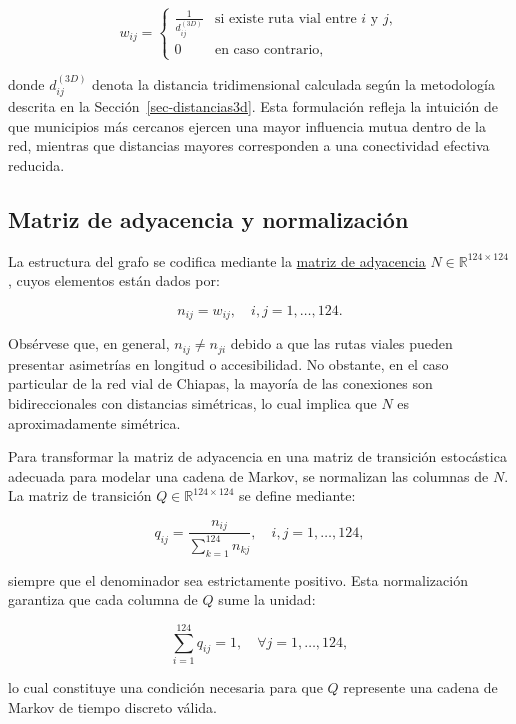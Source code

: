 \documentclass[
  spanish,
  us-letterpaper,
]{scrreprt}
\numberwithin{equation}{section}
\begin{document}
\[
w_{ij} = \begin{cases}
\displaystyle \frac{1}{d_{ij}^{(3D)}} & \text{si existe ruta vial entre } i \text{ y } j, \\
0 & \text{en caso contrario},
\end{cases}
\]

donde \(d_{ij}^{(3D)}\) denota la distancia tridimensional calculada
según la metodología descrita en la Sección~\ref{sec-distancias3d}. Esta
formulación refleja la intuición de que municipios más cercanos ejercen
una mayor influencia mutua dentro de la red, mientras que distancias
mayores corresponden a una conectividad efectiva reducida.

\subsection{Matriz de adyacencia y
normalización}\label{matriz-de-adyacencia-y-normalizaciuxf3n}

La estructura del grafo se codifica mediante la
\href{https://github.com/AngelaOrtiz25/tesis_angela/blob/gh-pages/datos\%20y\%20codigos/matriz_transicion_3d\%20(2).csv}{matriz
de adyacencia} \(N \in \mathbb{R}^{124 \times 124}\), cuyos elementos
están dados por:

\[
n_{ij} = w_{ij}, \quad i,j = 1,\dots,124.
\]

Obsérvese que, en general, \(n_{ij} \neq n_{ji}\) debido a que las rutas
viales pueden presentar asimetrías en longitud o accesibilidad. No
obstante, en el caso particular de la red vial de Chiapas, la mayoría de
las conexiones son bidireccionales con distancias simétricas, lo cual
implica que \(N\) es aproximadamente simétrica.

Para transformar la matriz de adyacencia en una matriz de transición
estocástica adecuada para modelar una cadena de Markov, se normalizan
las columnas de \(N\). La matriz de transición
\(Q \in \mathbb{R}^{124 \times 124}\) se define mediante:

\[
q_{ij} = \frac{n_{ij}}{\sum_{k=1}^{124} n_{kj}}, \quad i,j = 1,\dots,124,
\]

siempre que el denominador sea estrictamente positivo. Esta
normalización garantiza que cada columna de \(Q\) sume la unidad:

\[
\sum_{i=1}^{124} q_{ij} = 1, \quad \forall j = 1,\dots,124,
\]

lo cual constituye una condición necesaria para que \(Q\) represente una
cadena de Markov de tiempo discreto válida.
\end{document}
